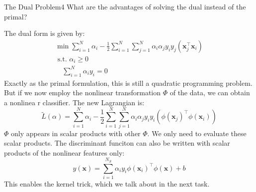 \begin{questions}

%
\begin{answer}\end{answer}


\begin{question}{The Dual Problem}{4}
What are the advantages of solving the dual instead of the primal?
	
\begin{answer}
The dual form is given by:
\begin{equation}
\begin{array}{l}{\min \sum_{i=1}^{N} \alpha_{i}-\frac{1}{2} \sum_{i=1}^{N} \sum_{j=1}^{N} \alpha_{i} \alpha_{j} y_{i} y_{j}(\mathbf{x}_{j}^{\top} \mathbf{x}_{i})} \\ {\textrm { s.t. } \alpha_{i} \geq 0} \\ {\quad \sum_{i=1}^{N} \alpha_{i} y_{i}=0}
\end{array}
\end{equation}
Exactly as the primal formulation, this is still a quadratic programming problem.
But if we now employ the nonlinear transformation $\Phi$ of the data, we can obtain a nonlinea r classifier. The new Lagrangian is:
\begin{equation}
\tilde{L}(\alpha)=\sum_{i=1}^{N} \alpha_{i}-\frac{1}{2} \sum_{i=1}^{N} \sum_{j=1}^{N} \alpha_{i} \alpha_{j} y_{i} y_{i}(\phi(\mathbf{x}_{j})^{\top} \phi(\mathbf{x}_{i}))
\end{equation}
$\Phi$  only appears in scalar products with other $\Phi$. We only need to evaluate these scalar products. The discriminant funciton can also be written with scalar products of the nonlinear features only:
\begin{equation}
y(\mathbf{x})=\sum_{i=1}^{N_{S}} \alpha_{i} y_{i} \phi(\mathbf{x}_{i})^{\top} \phi(\mathbf{x})+b
\end{equation}
This enables the kernel trick, which we talk about in the next task.
\end{answer}
\end{question}



\end{questions}
